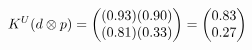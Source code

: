 \documentclass[preview]{standalone}
\begin{document}
\begin{align*}
\special{dvisvgm:raw <g id='unique000'>}K^U(d \otimes p) = \begin{pmatrix} (0.93)(0.90) \\ (0.81)(0.33) \end{pmatrix} = \begin{pmatrix} 0.83 \\ 0.27 \end{pmatrix}\special{dvisvgm:raw </g>}
\end{align*}
\end{document}
